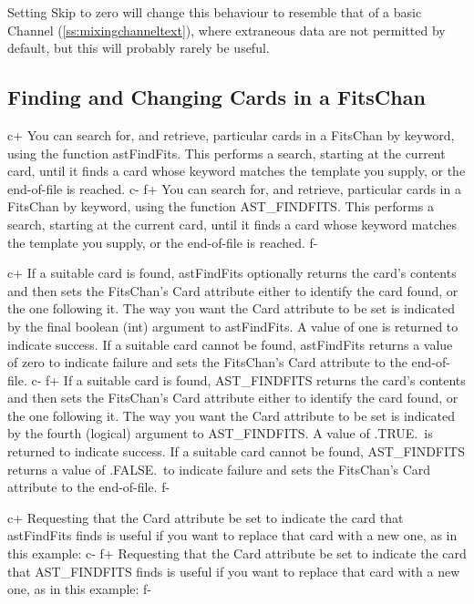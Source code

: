 \documentclass[twoside,11pt]{article}
\newcommand{\secref}[1]{\S\ref{#1}}
\renewcommand{\secref}[1]{\ref{#1}}
\begin{document}
Setting Skip to zero will change this behaviour to resemble that of a
basic Channel (\secref{ss:mixingchanneltext}), where extraneous data
are not permitted by default, but this will probably rarely be useful.

\subsection{\label{ss:findingandchangingfits}Finding and Changing Cards in a FitsChan}

c+
You can search for, and retrieve, particular cards in a FitsChan by
keyword, using the function astFindFits. This performs a search,
starting at the current card, until it finds a card whose keyword
matches the template you supply, or the end-of-file is reached.
c-
f+
You can search for, and retrieve, particular cards in a FitsChan by
keyword, using the function AST\_FINDFITS. This performs a search,
starting at the current card, until it finds a card whose keyword
matches the template you supply, or the end-of-file is reached.
f-

c+
If a suitable card is found, astFindFits optionally returns the card's
contents and then sets the FitsChan's Card attribute either to
identify the card found, or the one following it. The way you want the
Card attribute to be set is indicated by the final boolean (int)
argument to astFindFits. A value of one is returned to indicate
success.  If a suitable card cannot be found, astFindFits returns a
value of zero to indicate failure and sets the FitsChan's Card
attribute to the end-of-file.
c-
f+
If a suitable card is found, AST\_FINDFITS returns the card's contents
and then sets the FitsChan's Card attribute either to identify the
card found, or the one following it. The way you want the Card
attribute to be set is indicated by the fourth (logical) argument to
AST\_FINDFITS. A value of .TRUE.\ is returned to indicate success.  If
a suitable card cannot be found, AST\_FINDFITS returns a value of
.FALSE.\ to indicate failure and sets the FitsChan's Card attribute to
the end-of-file.
f-

c+
Requesting that the Card attribute be set to indicate the card that
astFindFits finds is useful if you want to replace that card with a
new one, as in this example:
c-
f+
Requesting that the Card attribute be set to indicate the card that
AST\_FINDFITS finds is useful if you want to replace that card with a
new one, as in this example:
f-
\end{document}

